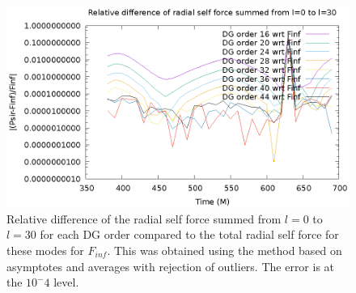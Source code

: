 \begin{figure}
\includegraphics{reldiffpsirvtwfinfdgorders}
\caption{Relative difference of the radial self force summed from $l=0$ to $l=30$  for each DG order compared to the total radial self force for these modes for $F_{inf}$. This was obtained using the method based on asymptotes and averages with rejection of outliers. The error is at the $10^-4$ level.}
\label{relmixed}
\end{figure}
